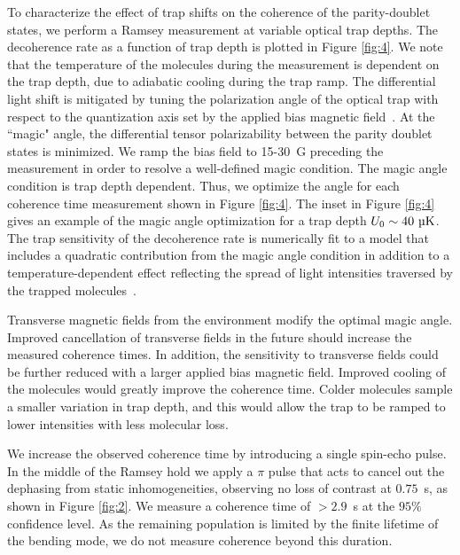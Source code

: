 \documentclass[
superscriptaddress,
twocolumn,
amsmath,amssymb,
aps,
prx,
nofootinbib,
]{revtex4-2}
\begin{document}
To characterize the effect of trap shifts on the coherence of the parity-doublet states, we perform a Ramsey measurement at variable optical trap depths. The decoherence rate as a function of trap depth is plotted in Figure \ref{fig:4}. We note that the temperature of the molecules during the measurement is dependent on the trap depth, due to adiabatic cooling during the trap ramp. The differential light shift is mitigated by tuning the polarization angle of the optical trap with respect to the quantization axis set by the applied bias magnetic field~\cite{Burchesky2021Rotational}. At the ``magic" angle, the differential tensor polarizability between the parity doublet states is minimized. We ramp the bias field to 15-30~G preceding the measurement in order to resolve a well-defined magic condition. The magic angle condition is trap depth dependent. Thus, we optimize the angle for each coherence time measurement shown in Figure \ref{fig:4}. The inset in Figure \ref{fig:4} gives an example of the magic angle optimization for a trap depth $U_0\sim40~\text{\textmu K}$. The trap sensitivity of the decoherence rate is numerically fit to a model that includes a quadratic contribution from the magic angle condition in addition to a temperature-dependent effect reflecting the spread of light intensities traversed by the trapped molecules~\cite{Supplemental}.

Transverse magnetic fields from the environment modify the optimal magic angle. Improved cancellation of transverse fields in the future should increase the measured coherence times. In addition, the sensitivity to transverse fields could be further reduced with a larger applied bias magnetic field. Improved cooling of the molecules would greatly improve the coherence time. Colder molecules sample a smaller variation in trap depth, and this would allow the trap to be ramped to lower intensities with less molecular loss.

We increase the observed coherence time by introducing a single spin-echo pulse. In the middle of the Ramsey hold we apply a $\pi$ pulse that acts to cancel out the dephasing from static inhomogeneities, observing no loss of contrast at $0.75$~s, as shown in Figure \ref{fig:2}. We measure a coherence time of $>$$2.9$~s at the $95\%$ confidence level. As the remaining population is limited by the finite lifetime of the bending mode, we do not measure coherence beyond this duration.
\end{document}
